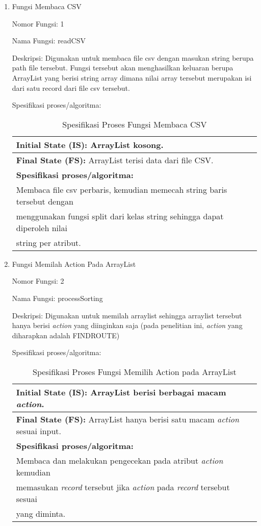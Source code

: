 \begin{enumerate}
	\item Fungsi Membaca CSV
	
	Nomor Fungsi: 1
	
	Nama Fungsi: readCSV
	
	Deskripsi: Digunakan untuk membaca file csv dengan masukan string berupa path file tersebut. Fungsi tersebut akan menghasilkan keluaran berupa ArrayList yang berisi string array dimana nilai array tersebut merupakan isi dari satu record dari file csv tersebut.
	
	Spesifikasi proses/algoritma:
	\begin{table}[h]
	\caption{Spesifikasi Proses Fungsi Membaca CSV}
	\label{table:spesifikasiMembacaCSV}
	\centering
	\begin{tabular}{|l|}
	\hline
	\textbf{Initial State (IS): }ArrayList kosong.													 \\ \hline
	\textbf{Final State (FS): }ArrayList terisi data dari file CSV. 				 \\ \hline
	\textbf{Spesifikasi proses/algoritma:}																 \\
	Membaca file csv perbaris, kemudian memecah string baris tersebut dengan \\
	menggunakan fungsi split dari kelas string sehingga dapat diperoleh nilai \\
	string per atribut. \\ \hline	
	\end{tabular}
	\end{table}
	
	
	\item Fungsi Memilah Action Pada ArrayList
	
	Nomor Fungsi: 2
	
	Nama Fungsi: processSorting
	
	Deskripsi: Digunakan untuk memilah arraylist sehingga arraylist tersebut hanya berisi \textsl{action} yang diinginkan saja (pada penelitian ini, \textsl{action} yang diharapkan adalah FINDROUTE)
	
	Spesifikasi proses/algoritma:
	\begin{table}[h]
	\caption{Spesifikasi Proses Fungsi Memilih Action pada ArrayList}
	\label{table:spesifikasiMemilihAction}
	\centering
	\begin{tabular}{|l|}
	\hline
	\textbf{Initial State (IS): }ArrayList berisi berbagai macam \textsl{action}.		 					\\ \hline
	\textbf{Final State (FS): }ArrayList hanya berisi satu macam \textsl{action} sesuai input.	\\ \hline
	\textbf{Spesifikasi proses/algoritma:}																 \\
	Membaca dan melakukan pengecekan pada atribut \textsl{action} kemudian  									 \\
	memasukan \textsl{record} tersebut jika \textsl{action} pada \textsl{record} tersebut sesuai\\
	yang diminta. \\ \hline	
	\end{tabular}
	\end{table}
	

\end{enumerate}
